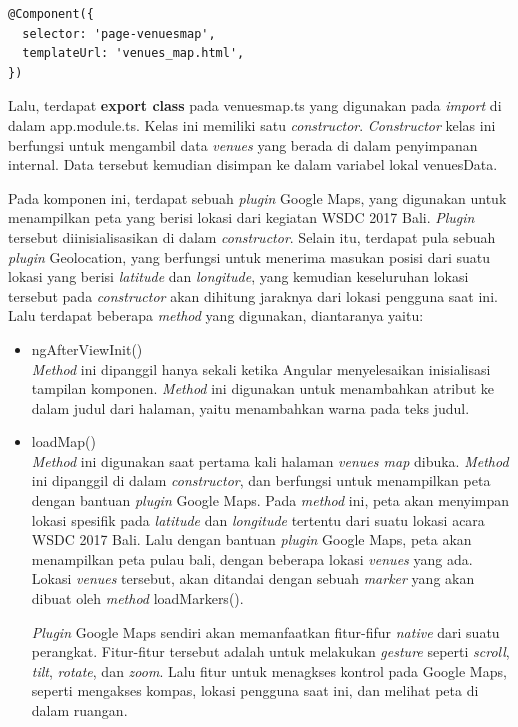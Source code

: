 \begin{itemize}
\begin{lstlisting}[language=html, label={lst:componentVenuesMap}, caption=@Component pada venues\textunderscore map.ts]
@Component({
  selector: 'page-venuesmap',
  templateUrl: 'venues_map.html',
})
\end{lstlisting}	

	Lalu, terdapat \textbf{export class} pada venues\textunderscore map.ts yang digunakan pada \textit{import} di dalam app.module.ts. Kelas ini memiliki satu \textit{constructor}. \textit{Constructor} kelas ini berfungsi untuk mengambil data \textit{venues} yang berada di dalam penyimpanan internal. Data tersebut kemudian disimpan ke dalam variabel lokal venuesData.
	
	Pada komponen ini, terdapat sebuah \textit{plugin} Google Maps, yang digunakan untuk menampilkan peta yang berisi lokasi dari kegiatan WSDC 2017 Bali. \textit{Plugin} tersebut diinisialisasikan di dalam \textit{constructor}. Selain itu, terdapat pula sebuah \textit{plugin} Geolocation, yang berfungsi untuk menerima masukan posisi dari suatu lokasi yang berisi \textit{latitude} dan \textit{longitude}, yang kemudian keseluruhan lokasi tersebut pada \textit{constructor} akan dihitung jaraknya dari lokasi pengguna saat ini. Lalu terdapat beberapa \textit{method} yang digunakan, diantaranya yaitu:
	
	\begin{itemize}
		\item ngAfterViewInit()\\
		\textit{Method} ini dipanggil hanya sekali ketika Angular menyelesaikan inisialisasi tampilan komponen. \textit{Method} ini digunakan untuk menambahkan atribut ke dalam judul dari halaman, yaitu menambahkan warna pada teks judul.
		\item loadMap() \\
		\textit{Method} ini digunakan saat pertama kali halaman \textit{venues map} dibuka. \textit{Method} ini dipanggil di dalam \textit{constructor}, dan berfungsi untuk menampilkan peta dengan bantuan \textit{plugin} Google Maps. Pada \textit{method} ini, peta akan menyimpan lokasi spesifik  pada \textit{latitude} dan \textit{longitude} tertentu dari suatu lokasi acara WSDC 2017 Bali. Lalu dengan bantuan \textit{plugin} Google Maps, peta akan menampilkan peta pulau bali, dengan beberapa lokasi \textit{venues} yang ada. Lokasi \textit{venues} tersebut, akan ditandai dengan sebuah \textit{marker} yang akan dibuat oleh \textit{method} loadMarkers().
		
		\textit{Plugin} Google Maps sendiri akan memanfaatkan fitur-fifur \textit{native} dari suatu perangkat. Fitur-fitur tersebut adalah untuk melakukan \textit{gesture} seperti \textit{scroll}, \textit{tilt}, \textit{rotate}, dan \textit{zoom}. Lalu fitur untuk menagkses kontrol pada Google Maps, seperti mengakses kompas, lokasi pengguna saat ini, dan melihat peta di dalam ruangan.
		

\end{itemize}
\end{itemize}

